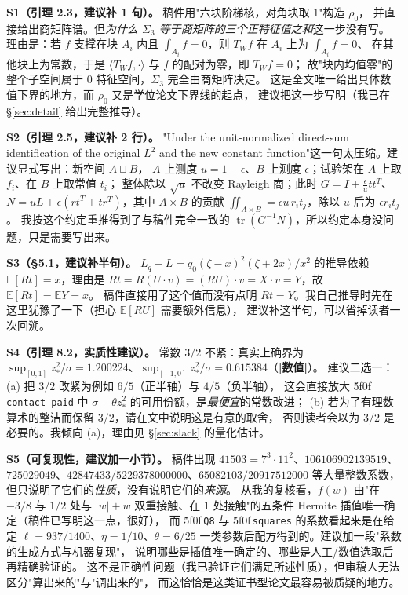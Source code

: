 \documentclass[UTF8,11pt]{ctexart}
\theoremstyle{definition}
\newcommand{\tr}{\operatorname{tr}}
\newcommand{\E}{\mathbb{E}}
\newcommand{\peq}[1]{\textup{\u5f0f}\,\texttt{#1}}
\newcommand{\num}{\textcolor[rgb]{0.55,0.35,0.00}{\bfseries [数值]}}
\begin{document}
\textbf{S1（引理 2.3，建议补 1 句）。} 稿件用"六块阶梯核，对角块取 $1$"构造 $\rho_0$，
并直接给出商矩阵谱。但\emph{为什么 $\Sigma_3$ 等于商矩阵的三个正特征值之和}这一步没有写。
理由是：若 $f$ 支撑在块 $A_i$ 内且 $\int_{A_i}f=0$，则 $T_Wf$ 在 $A_i$ 上为 $\int_{A_i}f=0$、
在其他块上为常数，于是 $\langle T_Wf,\cdot\rangle$ 与 $f$ 的配对为零，即 $T_Wf=0$；
故"块内均值零"的整个子空间属于 $0$ 特征空间，$\Sigma_3$ 完全由商矩阵决定。
这是全文唯一给出具体数值下界的地方，而 $\rho_0$ 又是学位论文下界线的起点，
建议把这一步写明（我已在 \S\ref{sec:detail} 给出完整推导）。

\textbf{S2（引理 2.5，建议补 2 行）。} "Under the unit-normalized direct-sum identification of the
original $L^2$ and the new constant function"这一句太压缩。建议显式写出：新空间 $A\sqcup B$，
$A$ 上测度 $u=1-\epsilon$、$B$ 上测度 $\epsilon$；试验架在 $A$ 上取 $f_i$、在 $B$ 上取常值 $t_i$；
整体除以 $\sqrt u$ 不改变 Rayleigh 商；此时
$G=I+\frac\epsilon u tt^T$、$N=uL+\epsilon(rt^T+tr^T)$，其中 $A\times B$ 的贡献
$\iint_{A\times B}=\epsilon u\,r_it_j$，除以 $u$ 后为 $\epsilon r_it_j$。
我按这个约定重推得到了与稿件完全一致的 $\tr(G^{-1}N)$，所以约定本身没问题，只是需要写出来。

\textbf{S3（\S5.1，建议补半句）。} $L_q-L=q_0(\zeta-x)^2(\zeta+2x)/x^2$ 的推导依赖
$\E[Rt]=x$，理由是 $Rt=R(U\cdot v)=(RU)\cdot v=X\cdot v=Y$，故 $\E[Rt]=\E Y=x$。
稿件直接用了这个值而没有点明 $Rt=Y$。我自己推导时先在这里犹豫了一下（担心 $\E[RU]$ 需要额外信息），
建议补这半句，可以省掉读者一次回溯。

\textbf{S4（引理 8.2，实质性建议）。} 常数 $3/2$ 不紧：真实上确界为
$\sup_{[0,1]}z_*^2/\sigma=1.200224$、$\sup_{[-1,0]}z_*^2/\sigma=0.615384$（\num）。
建议二选一：(a) 把 $3/2$ 改紧为例如 $6/5$（正半轴）与 $4/5$（负半轴），
这会直接放大 \peq{contact-paid} 中 $\sigma-\theta z_*^2$ 的可用份额，是\emph{最便宜}的常数改进；
(b) 若为了有理数算术的整洁而保留 $3/2$，请在文中说明这是有意的取舍，
否则读者会以为 $3/2$ 是必要的。我倾向 (a)，理由见 \S\ref{sec:slack} 的量化估计。

\textbf{S5（可复现性，建议加一小节）。} 稿件出现 $41503=7^3\cdot11^2$、$106106902139519$、
$725029049$、$42847433/5229378000000$、$65082103/20917512000$ 等大量整数系数，
但只说明了它们的\emph{性质}，没有说明它们的\emph{来源}。
从我的复核看，$f(w)$ 由"在 $-3/8$ 与 $1/2$ 处与 $|w|+w$ 双重接触、在 $1$ 处接触"的五条件
Hermite 插值唯一确定（稿件已写明这一点，很好），
而 \peq{Q8} 与 \peq{squares} 的系数看起来是在给定 $\ell=937/1400$、$\eta=1/10$、$\theta=6/25$
一类参数后配方得到的。建议加一段"系数的生成方式与机器复现"，
说明哪些是插值唯一确定的、哪些是人工/数值选取后再精确验证的。
这不是正确性问题（我已验证它们满足所述性质），但审稿人无法区分"算出来的"与"调出来的"，
而这恰恰是这类证书型论文最容易被质疑的地方。
\end{document}
